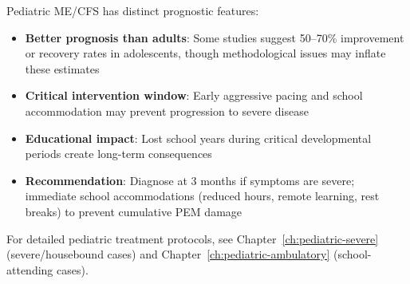 \begin{observation}
\label{obs:pediatric-prognosis}
Pediatric ME/CFS has distinct prognostic features:
\begin{itemize}
    \item \textbf{Better prognosis than adults}: Some studies suggest 50--70\% improvement or recovery rates in adolescents, though methodological issues may inflate these estimates
    \item \textbf{Critical intervention window}: Early aggressive pacing and school accommodation may prevent progression to severe disease
    \item \textbf{Educational impact}: Lost school years during critical developmental periods create long-term consequences
    \item \textbf{Recommendation}: Diagnose at 3 months if symptoms are severe; immediate school accommodations (reduced hours, remote learning, rest breaks) to prevent cumulative PEM damage
\end{itemize}

For detailed pediatric treatment protocols, see Chapter~\ref{ch:pediatric-severe} (severe/housebound cases) and Chapter~\ref{ch:pediatric-ambulatory} (school-attending cases).
\end{observation}


